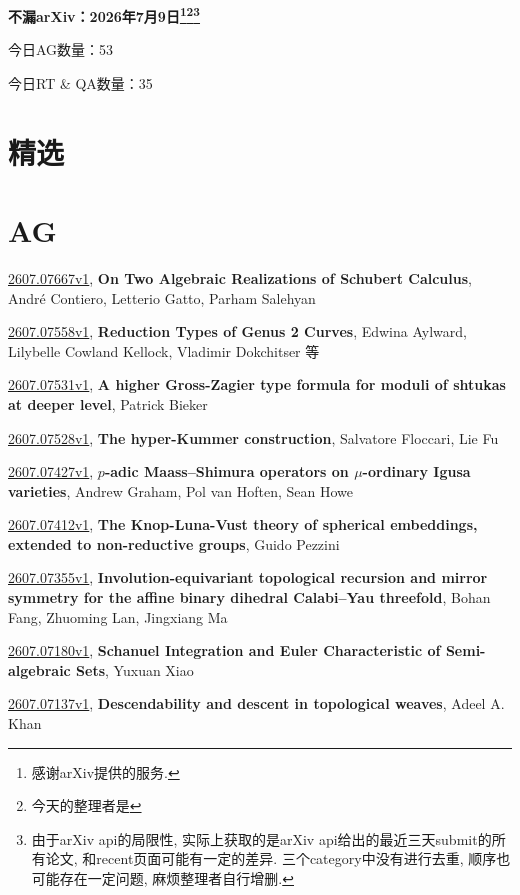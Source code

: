 \documentclass[9pt, a4paper]{article}
\theoremstyle{plain}
\theoremstyle{definition}
\theoremstyle{remark}
\newcommand{\arxiv}[3]{\href{https://arxiv.org/abs/#1}{#1}, \textbf{\textcolor{arxivblue}{#2}}, #3}
\newcommand{\AGnumber}{53}
\newcommand{\RTQAnumber}{35}
\newcommand{\NewestDate}{2026年7月9日}
\newcommand{\todayarXiver}{} %
\begin{document}
\begin{center}
    \Huge\textbf{不漏arXiv：\NewestDate\footnote{感谢arXiv提供的服务.}\footnote{今天的整理者是\todayarXiver}\footnote{由于arXiv api的局限性, 实际上获取的是arXiv api给出的最近三天submit的所有论文, 和recent页面可能有一定的差异. 三个category中没有进行去重, 顺序也可能存在一定问题, 麻烦整理者自行增删.}} \\
\end{center}

\setcounter{section}{-1}

\begin{center}
    今日AG数量：\AGnumber
    
    今日RT \& QA数量：\RTQAnumber
    
\end{center}


\section{精选}


\section{AG}
\arxiv{2607.07667v1}{On Two Algebraic Realizations of Schubert Calculus}{André Contiero, Letterio Gatto, Parham Salehyan}

\arxiv{2607.07558v1}{Reduction Types of Genus 2 Curves}{Edwina Aylward, Lilybelle Cowland Kellock, Vladimir Dokchitser 等}

\arxiv{2607.07531v1}{A higher Gross-Zagier type formula for moduli of shtukas at deeper level}{Patrick Bieker}

\arxiv{2607.07528v1}{The hyper-Kummer construction}{Salvatore Floccari, Lie Fu}

\arxiv{2607.07427v1}{$p$-adic Maass--Shimura operators on $μ$-ordinary Igusa varieties}{Andrew Graham, Pol van Hoften, Sean Howe}

\arxiv{2607.07412v1}{The Knop-Luna-Vust theory of spherical embeddings, extended to non-reductive groups}{Guido Pezzini}

\arxiv{2607.07355v1}{Involution-equivariant topological recursion and mirror symmetry for the affine binary dihedral Calabi--Yau threefold}{Bohan Fang, Zhuoming Lan, Jingxiang Ma}

\arxiv{2607.07180v1}{Schanuel Integration and Euler Characteristic of Semi-algebraic Sets}{Yuxuan Xiao}

\arxiv{2607.07137v1}{Descendability and descent in topological weaves}{Adeel A. Khan}
\end{document}
